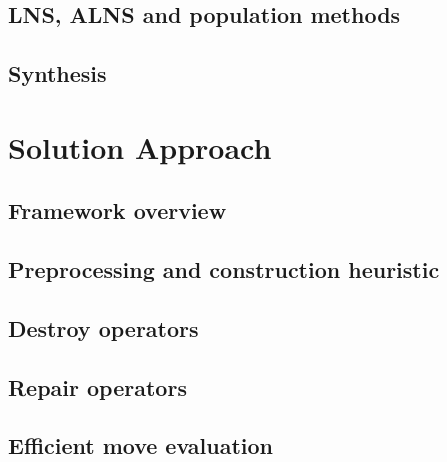 \documentclass[10pt, a4paper]{article}
\begin{document}
\subsection{LNS, ALNS and population methods}
\subsection{Synthesis}

\section{Solution Approach}
\subsection{Framework overview}
\subsection{Preprocessing and construction heuristic}
\subsection{Destroy operators}
\subsection{Repair operators}
\subsection{Efficient move evaluation}
\end{document}
